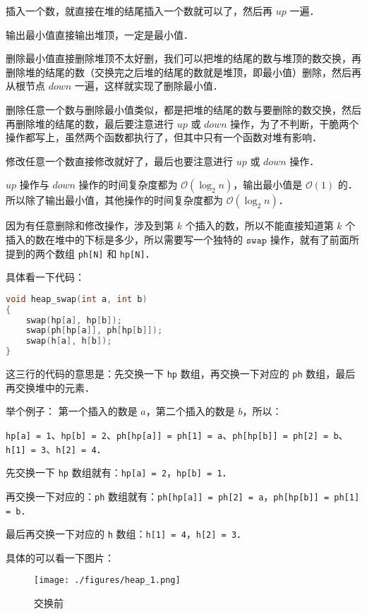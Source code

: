 插入一个数，就直接在堆的结尾插入一个数就可以了，然后再 $up$ 一遍．

输出最小值直接输出堆顶，一定是最小值．

删除最小值直接删除堆顶不太好删，我们可以把堆的结尾的数与堆顶的数交换，再删除堆的结尾的数（交换完之后堆的结尾的数就是堆顶，即最小值）删除，然后再从根节点 $down$ 一遍，这样就实现了删除最小值．

删除任意一个数与删除最小值类似，都是把堆的结尾的数与要删除的数交换，然后再删除堆的结尾的数，最后要注意进行 $up$ 或 $down$ 操作，为了不判断，干脆两个操作都写上，虽然两个函数都执行了，但其中只有一个函数对堆有影响．

修改任意一个数直接修改就好了，最后也要注意进行 $up$ 或 $down$ 操作．

$up$ 操作与 $down$ 操作的时间复杂度都为 $\mathcal{O}(\log_2 n)$，输出最小值是 $\mathcal{O}(1)$ 的．所以除了输出最小值，其他操作的时间复杂度都为 $\mathcal{O}(\log_2 n)$．

因为有任意删除和修改操作，涉及到第 $k$ 个插入的数，所以不能直接知道第 $k$ 个插入的数在堆中的下标是多少，所以需要写一个独特的 $\mathtt{swap}$ 操作，就有了前面所提到的两个数组 \verb|ph[N]| 和 \verb|hp[N]|．

具体看一下代码：

\begin{lstlisting}[language=cpp]
void heap_swap(int a, int b)
{
    swap(hp[a], hp[b]);
    swap(ph[hp[a]], ph[hp[b]]);
    swap(h[a], h[b]);
}
\end{lstlisting}

这三行的代码的意思是：先交换一下 \verb|hp| 数组，再交换一下对应的 \verb|ph| 数组，最后再交换堆中的元素．

举个例子：
第一个插入的数是 $a$，第二个插入的数是 $b$，所以：

\verb|hp[a] = 1|、\verb|hp[b] = 2|、\verb|ph[hp[a]] = ph[1] = a|、\verb|ph[hp[b]] = ph[2] = b|、\verb|h[1] = 3|、\verb|h[2] = 4|．

先交换一下 \verb|hp| 数组就有：\verb|hp[a] = 2|，\verb|hp[b] = 1|．

再交换一下对应的：\verb|ph| 数组就有：\verb|ph[hp[a]] = ph[2] = a|，\verb|ph[hp[b]] = ph[1] = b|．

最后再交换一下对应的 \verb|h| 数组：\verb|h[1] = 4|，\verb|h[2] = 3|．

具体的可以看一下图片：
\begin{figure}[ht]
\centering
\texttt{[image: ./figures/heap\_1.png]}
\caption{交换前} \label{heap_fig1}
\end{figure}

